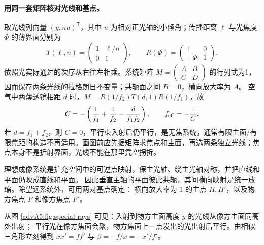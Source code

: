 \paragraph{用同一套矩阵核对光线和基点。}
取光线列向量 $(y,nu)^{\mathsf T}$，其中 $u$ 为相对正光轴的小倾角；传播距离 $\ell$ 与光焦度 $\Phi$ 的薄界面分别为
\[
 T(\ell,n)=\begin{pmatrix}1&\ell/n\\0&1\end{pmatrix},
 \qquad R(\Phi)=\begin{pmatrix}1&0\\-\Phi&1\end{pmatrix}.
\]
依照光实际通过的次序从右往左相乘。系统矩阵 $M=(\begin{smallmatrix}A&B\\C&D\end{smallmatrix})$ 的行列式为1，因而保存两条光线的拉格朗日不变量；共轭面之间 $B=0$，横向放大率为 $A$。
空气中两薄透镜相距 $d$ 时，$M=R(1/f_2)T(d,1)R(1/f_1)$，故
\[
 C=-\left(\frac1{f_1}+\frac1{f_2}-\frac d{f_1f_2}\right),
 \qquad f_{\rm eff}=-\frac1C.
\]
若 $d=f_1+f_2$，则 $C=0$，平行束入射后仍平行，是无焦系统，通常有限主面/有限焦距的构造不再适用。画图前应先据矩阵求焦点和主面，再选两条独立光线；焦点本身不是折射界面，光线不能在那里凭空拐折。


理想成像系统是扩充空间中的可逆点映射，保主光轴、绕主光轴对称，并把直线和平面仍映成直线和平面。
因此垂直主轴的平面彼此共轭，其间横向映射是统一放缩。除望远系统外，可用两对基点确定：
横向放大率为 $1$ 的主点 $H,H'$，以及物方焦点 $F$ 和像方焦点 $F'$。

\begin{center}\begin{minipage}{\linewidth}\centering
\centering
{}
\label{advA5:fig:special-rays}
\end{minipage}\end{center}

从图 \ref{advA5:fig:special-rays} 可见：入射到物方主面高度 $y$ 的光线从像方主面同高处出射；
平行光在像方焦面会聚，物方焦面上一点发出的光出射后平行。由相似三角形立刻得到
$xx'=ff'$ 与 $\beta=-f/x=-x'/f'$。


